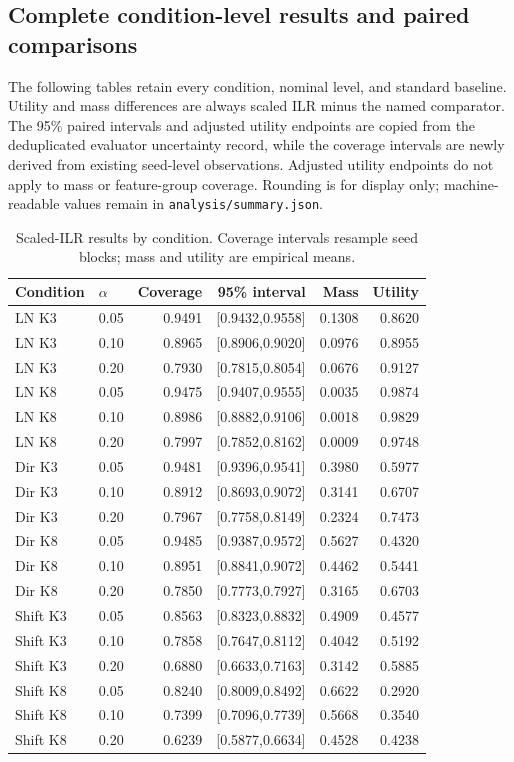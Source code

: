 \documentclass{article}
\begin{document}
\subsection{Complete condition-level results and paired comparisons}
The following tables retain every condition, nominal level, and standard baseline. Utility and mass differences are always scaled ILR minus the named comparator. The 95\% paired intervals and adjusted utility endpoints are copied from the deduplicated evaluator uncertainty record, while the coverage intervals are newly derived from existing seed-level observations. Adjusted utility endpoints do not apply to mass or feature-group coverage. Rounding is for display only; machine-readable values remain in \texttt{analysis/summary.json}. %
\begin{table}[p]
\centering\small
\caption{Scaled-ILR results by condition. Coverage intervals resample seed blocks; mass and utility are empirical means.}
\begin{tabular}{llrrrr}
\toprule
Condition & $\alpha$ & Coverage & 95\% interval & Mass & Utility \\
\midrule
LN K3 & 0.05 & 0.9491 & [0.9432,0.9558] & 0.1308 & 0.8620 \\
LN K3 & 0.10 & 0.8965 & [0.8906,0.9020] & 0.0976 & 0.8955 \\
LN K3 & 0.20 & 0.7930 & [0.7815,0.8054] & 0.0676 & 0.9127 \\
LN K8 & 0.05 & 0.9475 & [0.9407,0.9555] & 0.0035 & 0.9874 \\
LN K8 & 0.10 & 0.8986 & [0.8882,0.9106] & 0.0018 & 0.9829 \\
LN K8 & 0.20 & 0.7997 & [0.7852,0.8162] & 0.0009 & 0.9748 \\
Dir K3 & 0.05 & 0.9481 & [0.9396,0.9541] & 0.3980 & 0.5977 \\
Dir K3 & 0.10 & 0.8912 & [0.8693,0.9072] & 0.3141 & 0.6707 \\
Dir K3 & 0.20 & 0.7967 & [0.7758,0.8149] & 0.2324 & 0.7473 \\
Dir K8 & 0.05 & 0.9485 & [0.9387,0.9572] & 0.5627 & 0.4320 \\
Dir K8 & 0.10 & 0.8951 & [0.8841,0.9072] & 0.4462 & 0.5441 \\
Dir K8 & 0.20 & 0.7850 & [0.7773,0.7927] & 0.3165 & 0.6703 \\
Shift K3 & 0.05 & 0.8563 & [0.8323,0.8832] & 0.4909 & 0.4577 \\
Shift K3 & 0.10 & 0.7858 & [0.7647,0.8112] & 0.4042 & 0.5192 \\
Shift K3 & 0.20 & 0.6880 & [0.6633,0.7163] & 0.3142 & 0.5885 \\
Shift K8 & 0.05 & 0.8240 & [0.8009,0.8492] & 0.6622 & 0.2920 \\
Shift K8 & 0.10 & 0.7399 & [0.7096,0.7739] & 0.5668 & 0.3540 \\
Shift K8 & 0.20 & 0.6239 & [0.5877,0.6634] & 0.4528 & 0.4238 \\
\bottomrule
\end{tabular}
\end{table}
\end{document}

